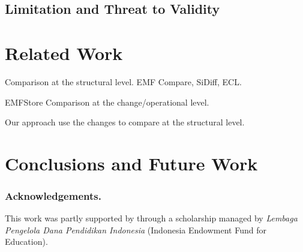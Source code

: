 \documentclass{llncs}
\begin{document}
\subsection{Limitation and Threat to Validity}
\label{sec:limitation_and_Threat_to_validity}

\section{Related Work}
\label{sec:related_work}

Comparison at the structural level. EMF Compare, SiDiff, ECL. 

EMFStore
Comparison at the change/operational level. 

Our approach use the changes to compare at the structural level.


\section{Conclusions and Future Work}
\label{sec:conclusion_and_future_work}


\cite{DBLP:conf/caise/IgnatN05}

\vspace{-10pt}
\subsubsection*{Acknowledgements.} This work was partly supported by through a scholarship managed by \emph{Lembaga Pengelola Dana Pendidikan Indonesia} (Indonesia Endowment Fund for Education).

 

\end{document}
